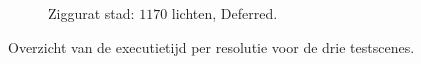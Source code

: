 \begin{figure}[t]
\begin{adjustbox}{minipage=\textwidth, scale=0.6}
\begin{subfigure}[b]{0.83\textwidth}
      \label{fig:ts-resolution-forward:city}
    \end{subfigure}
  \end{adjustbox} %
  \begin{adjustbox}{minipage=\textwidth, scale=0.6}
    \begin{subfigure}[b]{0.83\textwidth}
      \centering
      \def\svgwidth{\textwidth}
      
      \caption{Ziggurat stad: $1170$ lichten, Deferred.}
      \label{fig:ts-resolution-deferred:city}
    \end{subfigure}
  \end{adjustbox}
  \caption{Overzicht van de executietijd per resolutie voor de drie testscenes.}
  \label{fig:ts-resolution}
\end{figure}

